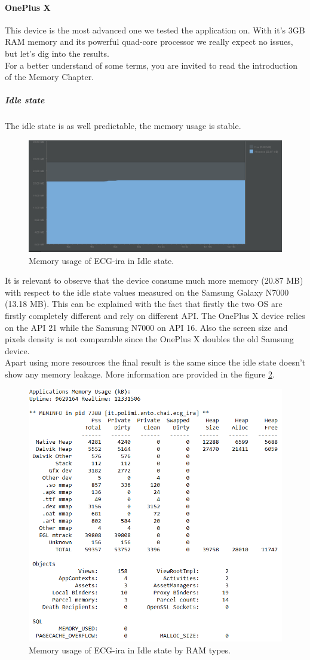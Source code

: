 \paragraph{OnePlus X}
This device  is the most advanced one we tested the application on. With it’s 3GB RAM memory and its powerful quad-core processor we really  expect no issues, but let’s dig into the results.\\
For a better understand of some terms, you are invited to read the introduction of the Memory Chapter.
\subparagraph{Idle state}
The idle state is as well predictable,  the memory usage is stable.
\begin{figure}[h!]
	\centering	
	\includegraphics[width=1\linewidth]{figures/ch10/20.png}
	\caption{ Memory usage of ECG-ira in Idle state.}  
	\label{fig10.20}
\end{figure}
It is relevant to observe that the device consume much more memory (20.87 MB) with respect to the idle state values measured on the Samsung Galaxy N7000 (13.18 MB). This can be explained with the fact that firstly the two OS are firstly completely different and rely on different API. The OnePlus X device relies on the API 21 while the Samsung N7000 on API 16. Also the screen size and pixels density is not comparable since the OnePlus X doubles the old Samsung device.\\
Apart using more resources the final result is the same since the idle state doesn’t show any memory leakage. More information are provided in the figure \ref{fig10.21}.
\begin{figure}[h!]
	\centering	
	\includegraphics[width=0.6\linewidth]{figures/ch10/21.png}
	\caption{ Memory usage of ECG-ira in Idle state by RAM types.}  
	\label{fig10.21}
\end{figure}
